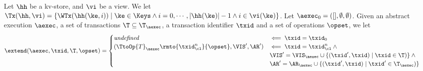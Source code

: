 \begin{definition}
\label{def:kvtrace2aexec}
Let $\hh$ be a kv-store, and $\vi$ be a view. We let $\Tx(\hh, \vi) = \{ \WTx(\hh(\ke, i)) \mid \ke \in \Keys \wedge 
i = 0,\cdots, \lvert \hh(\ke) \rvert - 1 \wedge i \in \vi(\ke) \}$. 
Let $\aexec_0 = ( [ ], \emptyset, \emptyset)$. Given an abstract execution $\aexec$, a set of transactions  
$\T \subseteq \T_{\aexec}$, a transaction identifier $\txid$ and a set of operations $\opset$, we let 
\[
\extend(\aexec, \txid, \T, \opset) = 
\begin{cases}
\textit{undefined} &\impliedby \txid = \txid_{0}\\
(\TtoOp{T}_{\aexec}\rmto{\txid_{\cl}^{n}}{\opset}, \VIS', \AR') & \impliedby \txid = \txid_{\cl}^{n} \wedge {}\\
& \VIS' = \VIS_{\aexec} \cup \{(\txid', \txid) \mid \txid \in \T)\} \wedge {}\\
& \AR' = \AR_{\aexec} \cup \{(\txid', \txid) \mid \txid' \in \T_{\aexec})\}\\
\end{cases}
\]


\end{definition}
